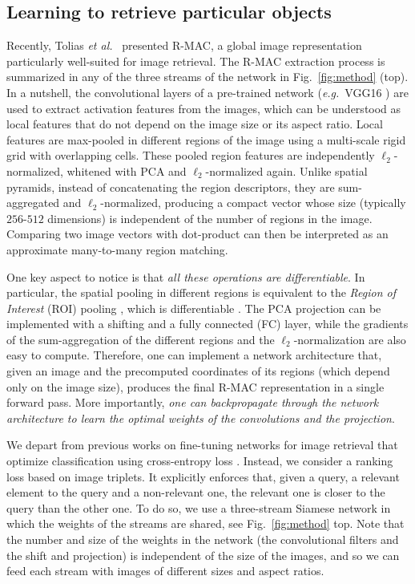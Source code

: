 \documentclass[runningheads]{llncs}
\newcommand{\myparagraph}[1]{\noindent {\bf #1.}}
\def\etal{\emph{et al.}~}
\def\eg{\emph{e.g.}~}
\begin{document}
\subsection{Learning to retrieve particular objects}
\label{sec:learning}
\myparagraph{R-MAC revisited} Recently, Tolias \etal\cite{Tolias2016} presented R-MAC, 
a global image representation particularly well-suited for image retrieval. 
The R-MAC extraction process is summarized in any of the three streams of the network in Fig.~\ref{fig:method} (top).
In a nutshell, the convolutional layers of a pre-trained network (\eg VGG16 \cite{Simonyan2014}) are used to extract
activation features from the images, which can be understood as local features that do not depend on the image size or its aspect ratio. 
Local features are max-pooled in different regions of the image using a multi-scale rigid grid with overlapping cells.
These pooled region features are independently $\ell_2$-normalized, whitened with PCA and $\ell_2$-normalized again.
Unlike spatial pyramids, instead of concatenating the region descriptors, they are sum-aggregated and $\ell_2$-normalized,
producing a compact vector whose size (typically $256$-$512$ dimensions) is independent of the number of regions in the
image. 
Comparing two image vectors with dot-product can then be interpreted as an approximate many-to-many region matching.

One key aspect to notice is that \emph{all these operations are differentiable}. In particular, the spatial pooling in
different regions is equivalent to the \emph{Region of Interest} (ROI) pooling \cite{He2014}, which is differentiable
\cite{Girshick2015}. The PCA projection can be implemented with a shifting and a fully connected (FC) layer, while the
gradients of the sum-aggregation of the different regions and the $\ell_2$-normalization are also easy to compute.
Therefore, one can implement a network architecture that, given an image and the precomputed coordinates of its regions (which depend only on the image size), produces the final R-MAC representation in a single forward pass. More importantly, \emph{one can backpropagate through the network architecture to learn the optimal weights of the convolutions and the projection}.


\myparagraph{Learning for particular instances}
We depart from previous works on fine-tuning networks for image retrieval that optimize classification using cross-entropy loss \cite{Babenko2014}.
Instead, we consider a ranking loss based on image triplets. It explicitly enforces that, given a query, a relevant element to the query and a non-relevant one, the relevant one is closer to the query than the other one. 
To do so, we use a three-stream Siamese network in which the weights of the streams are shared, see Fig.~\ref{fig:method} top.
Note that the number and size of the weights in the network (the convolutional filters and the shift and projection) is independent of the size of the images, and so we can feed each stream with images of different sizes and aspect ratios.
\end{document}
